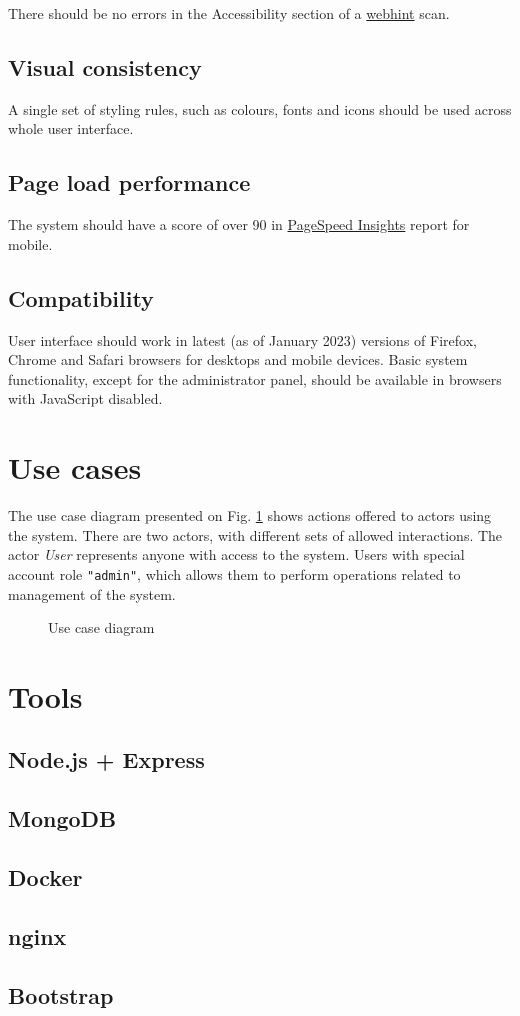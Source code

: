 There should be no errors in the Accessibility section of a \href{https://webhint.io/}{webhint} scan.

\subsection{Visual consistency}

A single set of styling rules, such as colours, fonts and icons should be used across whole user interface.

\subsection{Page load performance}

The system should have a score of over 90 in \href{https://pagespeed.web.dev}{PageSpeed Insights} report for mobile.

\subsection{Compatibility}

User interface should work in latest (as of January 2023) versions of Firefox, Chrome and Safari browsers for desktops and mobile devices. Basic system functionality, except for the administrator panel, should be available in browsers with JavaScript disabled.

\section{Use cases}

The use case diagram presented on Fig. \ref{fig:use-case-diag} shows actions offered to actors using the system. There are two actors, with different sets of allowed interactions. The actor \textit{User} represents anyone with access to the system. Users with special account role \texttt{"admin"}, which allows them to perform operations related to management of the system.

\begin{figure}
	\centering
	
	\caption{Use case diagram}
	\label{fig:use-case-diag}
\end{figure}

\section{Tools}



\subsection{Node.js + Express}

\subsection{MongoDB}

\subsection{Docker}

\subsection{nginx}

\subsection{Bootstrap}
